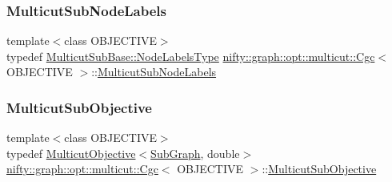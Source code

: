 \subsubsection{\texorpdfstring{Multicut\+Sub\+Node\+Labels}{MulticutSubNodeLabels}}
{\footnotesize\ttfamily template$<$class O\+B\+J\+E\+C\+T\+I\+VE$>$ \\
typedef \hyperlink{classnifty_1_1graph_1_1opt_1_1common_1_1SolverBase_abefd51561de2fd009f6bed6bef6009ea}{Multicut\+Sub\+Base\+::\+Node\+Labels\+Type} \hyperlink{classnifty_1_1graph_1_1opt_1_1multicut_1_1Cgc}{nifty\+::graph\+::opt\+::multicut\+::\+Cgc}$<$ O\+B\+J\+E\+C\+T\+I\+VE $>$\+::\hyperlink{classnifty_1_1graph_1_1opt_1_1multicut_1_1Cgc_a949c61ec3b2f609aa78abc2e7eef05e2}{Multicut\+Sub\+Node\+Labels}}

\mbox{\label{classnifty_1_1graph_1_1opt_1_1multicut_1_1Cgc_a19a2390f261fe4c0cdcbff8049e4519b}} 
\subsubsection{\texorpdfstring{Multicut\+Sub\+Objective}{MulticutSubObjective}}
{\footnotesize\ttfamily template$<$class O\+B\+J\+E\+C\+T\+I\+VE$>$ \\
typedef \hyperlink{classnifty_1_1graph_1_1opt_1_1multicut_1_1MulticutObjective}{Multicut\+Objective}$<$\hyperlink{classnifty_1_1graph_1_1opt_1_1multicut_1_1Cgc_a52317a6524a87782b8c6cc8cd27fa9fc}{Sub\+Graph}, double$>$ \hyperlink{classnifty_1_1graph_1_1opt_1_1multicut_1_1Cgc}{nifty\+::graph\+::opt\+::multicut\+::\+Cgc}$<$ O\+B\+J\+E\+C\+T\+I\+VE $>$\+::\hyperlink{classnifty_1_1graph_1_1opt_1_1multicut_1_1Cgc_a19a2390f261fe4c0cdcbff8049e4519b}{Multicut\+Sub\+Objective}}

\mbox{\label{classnifty_1_1graph_1_1opt_1_1multicut_1_1Cgc_a19f52bf3f00bed2816bd44604b94e7af}} 
